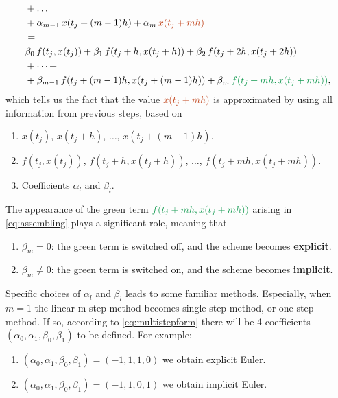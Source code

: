 \documentclass[12pt]{article}
\begin{document}
\begin{observationboxed}
\begin{align}
		 & + \dots
		\notag                             \\
		 & + \alpha_{m-1}\,x{(t_j+(m-1)h)}
		+ \alpha_m\,\textcolor{Bittersweet}{x{(t_j+mh)}}
		\notag                             \\
		 & = 
		\notag                             \\
		 & \beta_0\,f(t_j,x(t_j)) 
		+ \beta_1\,f(t_j+h,x(t_j+h))
		+ \beta_2\,f(t_j+2h,x(t_j+2h))
		\notag                             \\
		 & 
		+ \dots + 
		\notag                             \\
		 & 
		+ \beta_{m-1}\,f(t_j+(m-1)h,x(t_j+(m-1)h)) 
		+ \beta_{m}\,\textcolor{ForestGreen}{f(t_j+mh,x(t_j+mh))},
	\end{align}
	which tells us the fact that the value $\textcolor{Bittersweet}{x(t_j+mh)}$
	is approximated 
	by using all information from previous steps, based on
	\begin{enumerate}
		\item $x(t_j)$, $x{(t_j+h)}$, $\dots$, $x{(t_j+(m-1)h)}$.
		\item $f(t_j,x(t_j))$, $f(t_j+h,x(t_j+h))$, $\dots$, $f(t_j+mh,x(t_j+mh))$.
		\item Coefficients $\alpha_l$ and $\beta_l$.
	\end{enumerate}
\end{observationboxed}
\begin{observationboxed}
	The appearance of the green term $\textcolor{ForestGreen}{f(t_j+mh,x(t_j+mh))}$
	arising in \eqref{eq:assembling} plays a significant role, meaning that
	\begin{enumerate}
		\item $\beta_m = 0$: the green term is switched off, and the scheme becomes \textbf{explicit}.
		\item $\beta_m \neq 0$:  the green term is switched on, and the scheme becomes \textbf{implicit}.
	\end{enumerate}
\end{observationboxed}
\begin{observationboxed}
	Specific choices of $\alpha_l$ and $\beta_l$ leads to some familiar methods.
	Especially, when $m=1$ the linear m-step method becomes single-step method,
	or one-step method. If so, according to \eqref{eq:multistepform}
	there will be 4 coefficients $(\alpha_0,\alpha_1,\beta_0,\beta_1)$
	to be defined. For example:
	\begin{enumerate}
		\item $(\alpha_0,\alpha_1,\beta_0,\beta_1) = (-1,1,1,0)$ we obtain explicit Euler.
		\item $(\alpha_0,\alpha_1,\beta_0,\beta_1) = (-1,1,0,1)$ we obtain implicit Euler.
	\end{enumerate}
\end{observationboxed}
\end{document}
